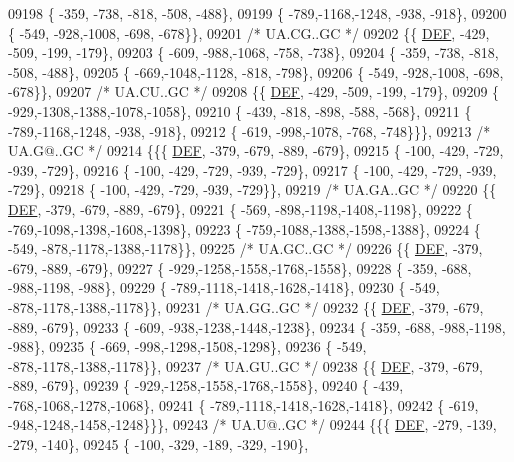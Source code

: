 \begin{DoxyCode}
09198 \{ -359, -738, -818, -508, -488\},
09199 \{ -789,-1168,-1248, -938, -918\},
09200 \{ -549, -928,-1008, -698, -678\}\},
09201 \textcolor{comment}{/* UA.CG..GC */}
09202 \{\{  \mbox{\hyperlink{1_88_84__epars_8h_a397419fc12b37ed479c8abb9d444d843}{DEF}}, -429, -509, -199, -179\},
09203 \{ -609, -988,-1068, -758, -738\},
09204 \{ -359, -738, -818, -508, -488\},
09205 \{ -669,-1048,-1128, -818, -798\},
09206 \{ -549, -928,-1008, -698, -678\}\},
09207 \textcolor{comment}{/* UA.CU..GC */}
09208 \{\{  \mbox{\hyperlink{1_88_84__epars_8h_a397419fc12b37ed479c8abb9d444d843}{DEF}}, -429, -509, -199, -179\},
09209 \{ -929,-1308,-1388,-1078,-1058\},
09210 \{ -439, -818, -898, -588, -568\},
09211 \{ -789,-1168,-1248, -938, -918\},
09212 \{ -619, -998,-1078, -768, -748\}\}\},
09213 \textcolor{comment}{/* UA.G@..GC */}
09214 \{\{\{  \mbox{\hyperlink{1_88_84__epars_8h_a397419fc12b37ed479c8abb9d444d843}{DEF}}, -379, -679, -889, -679\},
09215 \{ -100, -429, -729, -939, -729\},
09216 \{ -100, -429, -729, -939, -729\},
09217 \{ -100, -429, -729, -939, -729\},
09218 \{ -100, -429, -729, -939, -729\}\},
09219 \textcolor{comment}{/* UA.GA..GC */}
09220 \{\{  \mbox{\hyperlink{1_88_84__epars_8h_a397419fc12b37ed479c8abb9d444d843}{DEF}}, -379, -679, -889, -679\},
09221 \{ -569, -898,-1198,-1408,-1198\},
09222 \{ -769,-1098,-1398,-1608,-1398\},
09223 \{ -759,-1088,-1388,-1598,-1388\},
09224 \{ -549, -878,-1178,-1388,-1178\}\},
09225 \textcolor{comment}{/* UA.GC..GC */}
09226 \{\{  \mbox{\hyperlink{1_88_84__epars_8h_a397419fc12b37ed479c8abb9d444d843}{DEF}}, -379, -679, -889, -679\},
09227 \{ -929,-1258,-1558,-1768,-1558\},
09228 \{ -359, -688, -988,-1198, -988\},
09229 \{ -789,-1118,-1418,-1628,-1418\},
09230 \{ -549, -878,-1178,-1388,-1178\}\},
09231 \textcolor{comment}{/* UA.GG..GC */}
09232 \{\{  \mbox{\hyperlink{1_88_84__epars_8h_a397419fc12b37ed479c8abb9d444d843}{DEF}}, -379, -679, -889, -679\},
09233 \{ -609, -938,-1238,-1448,-1238\},
09234 \{ -359, -688, -988,-1198, -988\},
09235 \{ -669, -998,-1298,-1508,-1298\},
09236 \{ -549, -878,-1178,-1388,-1178\}\},
09237 \textcolor{comment}{/* UA.GU..GC */}
09238 \{\{  \mbox{\hyperlink{1_88_84__epars_8h_a397419fc12b37ed479c8abb9d444d843}{DEF}}, -379, -679, -889, -679\},
09239 \{ -929,-1258,-1558,-1768,-1558\},
09240 \{ -439, -768,-1068,-1278,-1068\},
09241 \{ -789,-1118,-1418,-1628,-1418\},
09242 \{ -619, -948,-1248,-1458,-1248\}\}\},
09243 \textcolor{comment}{/* UA.U@..GC */}
09244 \{\{\{  \mbox{\hyperlink{1_88_84__epars_8h_a397419fc12b37ed479c8abb9d444d843}{DEF}}, -279, -139, -279, -140\},
09245 \{ -100, -329, -189, -329, -190\},

\end{DoxyCode}
